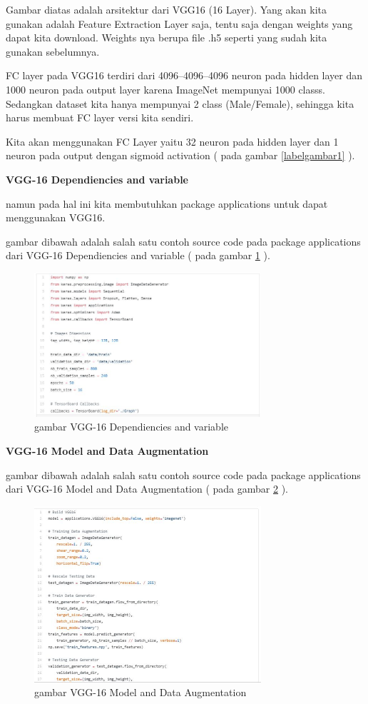 Gambar diatas adalah arsitektur dari VGG16 (16 Layer). Yang akan kita gunakan adalah Feature Extraction Layer saja, tentu saja dengan weights yang dapat kita download. Weights nya berupa file .h5 seperti yang sudah kita gunakan sebelumnya.

FC layer pada VGG16 terdiri dari 4096–4096–4096 neuron pada hidden layer dan 1000 neuron pada output layer karena ImageNet mempunyai 1000 classs. Sedangkan dataset kita hanya mempunyai 2 class (Male/Female), sehingga kita harus membuat FC layer versi kita sendiri.

Kita akan menggunakan FC Layer yaitu 32 neuron pada hidden layer dan 1 neuron pada output dengan sigmoid activation
( pada gambar \ref{labelgambar1} ).

\textbf{VGG-16 Dependiencies and variable} 

namun pada hal ini kita membutuhkan package applications untuk dapat menggunakan VGG16.

gambar dibawah adalah salah satu contoh source code pada package applications dari VGG-16 Dependiencies and variable ( pada gambar \ref{labelgambar2} ).
\begin{figure}[!htp]
	\includegraphics[width=0.75\textwidth]{figures/vgg1.jpeg}
	\caption{gambar VGG-16 Dependiencies and variable}
	\label{labelgambar2}
\end{figure}

\textbf{VGG-16 Model and Data Augmentation}

gambar dibawah adalah salah satu contoh source code pada package applications dari VGG-16 Model and Data Augmentation
( pada gambar \ref{labelgambar3} ).
\begin{figure}[!htp]
	\includegraphics[width=0.75\textwidth]{figures/vgg2.JPG}
	\caption{gambar VGG-16 Model and Data Augmentation}
	\label{labelgambar3}
\end{figure}

